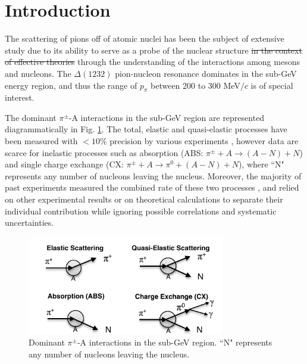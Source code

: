 \section{\label{sec:intro}Introduction\protect}
The scattering of pions off of atomic nuclei has been the subject of extensive study
due to its ability to serve as a probe of the nuclear structure \st{in the context of effective theories} through the understanding of the interactions among mesons and nucleons. The $\Delta(1232)$ pion-nucleon resonance dominates in the sub-GeV energy region, and thus the range of $p_{\pi}$ between 200 to 300 MeV$/c$ is of special interest.


The dominant $\pi^{\pm}$-A interactions in the sub-GeV region are represented diagrammatically in Fig. \ref{fig:interactions}. The total, elastic and quasi-elastic processes have been measured with $<10\%$ precision by various experiments \cite{Allardyce,Binon,Saunders,Gelderloos,Levenson,Ashery2,Ingram,Jones,Ashery,Bellotti1973,Bellotti1973_2}, however data are scarce for inelastic processes such as absorption (ABS: $\pi^{\pm}+A\rightarrow (A-N) + N$) and single charge exchange (CX: $\pi^{\pm} + A \rightarrow \pi^{0}+ (A-N) + N$), {\color{red} where ``N" represents any number of nucleons leaving the nucleus}. Moreover, the majority of past experiments measured the combined rate of these two processes \cite{gianneli,navon}, and relied on other experimental results or on theoretical calculations to separate their individual contribution while ignoring possible correlations and systematic uncertainties.

\begin{figure}[ht]
\includegraphics[width=86mm]{figures/Figure1_sep_paper_b_w.pdf}
\caption{Dominant $\pi^{\pm}$-A interactions in the sub-GeV region. ``N" represents any number of nucleons leaving the nucleus.}
\label{fig:interactions}
\end{figure}

